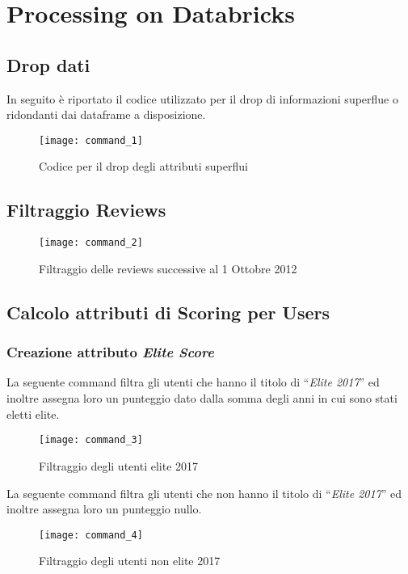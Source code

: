 
\chapter{Processing on Databricks}

\section{Drop dati}
In seguito è riportato il codice utilizzato per il drop di informazioni superflue
o ridondanti dai dataframe a disposizione.
\begin{figure}[!htbp]
	\texttt{[image: command\_1]}
	\caption{Codice per il drop degli attributi superflui}
	\label{command_1}
\end{figure}

\clearpage

\section{Filtraggio Reviews}

\begin{figure}[!htbp]
	\texttt{[image: command\_2]}
	\caption{Filtraggio delle reviews successive al 1 Ottobre 2012}
	\label{command_2}
\end{figure}

\clearpage

\section{Calcolo attributi di Scoring per Users}
\subsection{Creazione attributo \textit{Elite Score}}
La seguente command filtra gli utenti che hanno il titolo di ``\textit{Elite 2017}''
ed inoltre assegna loro un punteggio dato dalla somma degli anni in cui sono
stati eletti elite.
\begin{figure}[!htbp]
	\texttt{[image: command\_3]}
	\caption{Filtraggio degli utenti elite 2017}
	\label{command_3}
\end{figure}

La seguente command filtra gli utenti che non hanno il titolo di ``\textit{Elite 2017}''
ed inoltre assegna loro un punteggio nullo.
\begin{figure}[!htbp]
	\texttt{[image: command\_4]}
	\caption{Filtraggio degli utenti non elite 2017}
	\label{command_4}
\end{figure}

